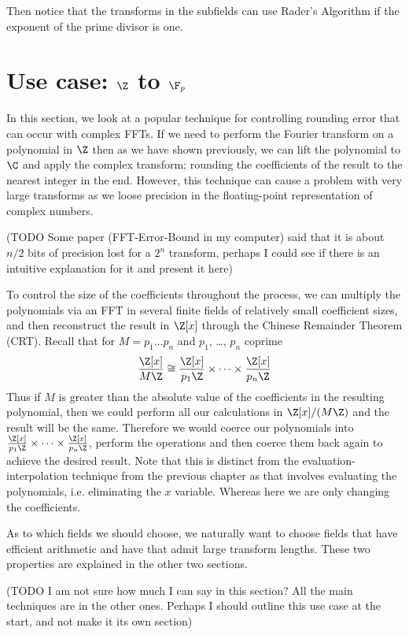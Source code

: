 Then notice that the transforms in the subfields can use Rader's Algorithm if the exponent of the prime divisor is one.


\section{Use case: $\Z$ to $\F_p$}\label{sec:Z-Fp}

In this section, we look at a popular technique for controlling rounding error that can occur with complex FFTs. If we need to perform the Fourier transform on a polynomial in $\Z$ then as we have shown previously, we can lift the polynomial to $\C$ and apply the complex transform; rounding the coefficients of the result to the nearest integer in the end. However, this technique can cause a problem with very large transforms as we loose precision in the floating-point representation of complex numbers.

\medskip
(TODO Some paper (FFT-Error-Bound in my computer) said that it is about $n / 2$ bits of precision lost for a $2^n$ transform, perhaps I could see if there is an intuitive explanation for it and present it here)
\medskip

To control the size of the coefficients throughout the process, we can multiply the polynomials via an FFT in several finite fields of relatively small coefficient sizes, and then reconstruct the result in $\Z[x]$ through the Chinese Remainder Theorem (CRT). Recall that for $M = p_1\ldots p_n$ and $p_1$, \ldots, $p_n$ coprime
\[
    \frac{\Z[x]}{M\Z} \cong \frac{\Z[x]}{p_1\Z} \times \cdots \times \frac{\Z[x]}{p_n\Z}
\]
Thus if $M$ is greater than the absolute value of the coefficients in the resulting polynomial, then we could perform all our calculations in $\Z[x]/(M \Z)$ and the result will be the same. Therefore we would coerce our polynomials into $\frac{\Z[x]}{p_1\Z} \times \cdots \times \frac{\Z[x]}{p_n\Z}$, perform the operations and then coerce them back again to achieve the desired result. Note that this is distinct from the evaluation-interpolation technique from the previous chapter as that involves evaluating the polynomials, i.e. eliminating the $x$ variable. Whereas here we are only changing the coefficients.

As to which fields we should choose, we naturally want to choose fields that have efficient arithmetic and have that admit large transform lengths. These two properties are explained in the other two sections.

(TODO I am not sure how much I can say in this section? All the main techniques are in the other ones. Perhaps I should outline this use case at the start, and not make it its own section)



